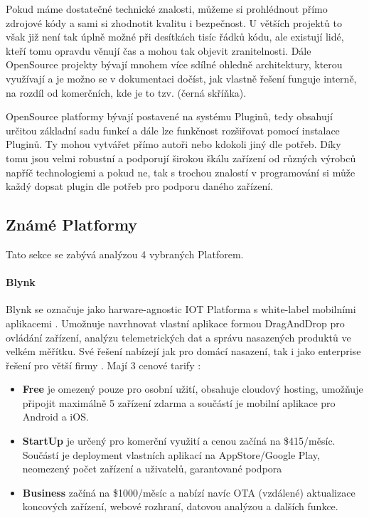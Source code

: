 Pokud máme dostatečné technické znalosti, můžeme si prohlédnout přímo zdrojové kódy a sami si zhodnotit kvalitu i bezpečnost. U větších projektů to však již není tak úplně možné při desítkách tisíc řádků kódu, ale existují lidé, kteří tomu opravdu věnují čas a mohou tak objevit zranitelnosti. Dále OpenSource projekty bývají mnohem více sdílné ohledně architektury, kterou využívají a je možno se v dokumentaci dočíst, jak vlastně řešení funguje interně, na rozdíl od komerčních, kde je to tzv.  (černá skříňka).

OpenSource platformy bývají postavené na systému Pluginů, tedy obsahují určitou základní sadu funkcí a dále lze funkčnost rozšiřovat pomocí instalace Pluginů. Ty mohou vytvářet přímo autoři nebo kdokoli jiný dle potřeb. Díky tomu jsou velmi robustní a podporují širokou škálu zařízení od různých výrobců napříč technologiemi a pokud ne, tak s trochou znalostí v programování si může každý dopsat plugin dle potřeb pro podporu daného zařízení.


\subsection{Známé Platformy}
Tato sekce se zabývá analýzou 4 vybraných Platforem.

\paragraph{Blynk}
Blynk se označuje jako harware-agnostic IOT Platforma s white-label mobilními aplikacemi \cite{blynk}. Umožnuje navrhnovat vlastní aplikace formou DragAndDrop pro ovládání zařízení, analýzu telemetrických dat a správu nasazených produktů ve velkém měřítku. Své řešení nabízejí jak pro domácí nasazení, tak i jako enterprise řešení pro větší firmy \cite{blynk}. Mají 3 cenové tarify \cite{blynk-pricing}:
\begin{itemize}
    \item \textbf{Free} je omezený pouze pro osobní užití, obsahuje cloudový hosting, umožňuje připojit maximálně 5 zařízení zdarma a součástí je mobilní aplikace pro Android a iOS.
    \item \textbf{StartUp} je určený pro komerční využití a cenou začíná na \$415/měsíc. Součástí je deployment vlastních aplikací na AppStore/Google Play, neomezený počet zařízení a uživatelů, garantované podpora
    \item \textbf{Business} začíná na \$1000/měsíc a nabízí navíc OTA (vzdálené) aktualizace koncových zařízení, webové rozhraní, datovou analýzou a dalších funkce.
\end{itemize}

